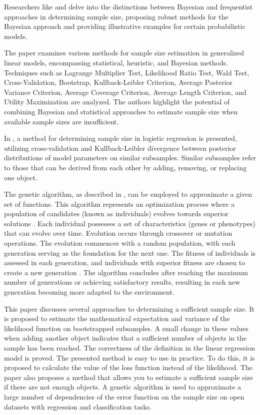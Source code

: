 \documentclass[
11pt,%
tightenlines,%
twoside,%
onecolumn,%
nofloats,%
nobibnotes,%
nofootinbib,%
superscriptaddress,%
noshowpacs,%
centertags]%
{revtex4-2}
\begin{document}
Researchers like \cite{Brutti2014} and \cite{Pezeshk2008} delve into the distinctions between Bayesian and frequentist approaches in determining sample size, proposing robust methods for the Bayesian approach and providing illustrative examples for certain probabilistic models.

The paper \cite{Grabovoy2022} examines various methods for sample size estimation in generalized linear models, encompassing statistical, heuristic, and Bayesian methods. Techniques such as Lagrange Multiplier Test, Likelihood Ratio Test, Wald Test, Cross-Validation, Bootstrap, Kullback-Leibler Criterion, Average Posterior Variance Criterion, Average Coverage Criterion, Average Length Criterion, and Utility Maximization are analyzed. The authors highlight the potential of combining Bayesian and statistical approaches to estimate sample size when available sample sizes are insufficient.

In \cite{MOTRENKO2014743}, a method for determining sample size in logistic regression is presented, utilizing cross-validation and Kullback-Leibler divergence between posterior distributions of model parameters on similar subsamples. Similar subsamples refer to those that can be derived from each other by adding, removing, or replacing one object.

The genetic algorithm, as described in \citep{Goldberg1988}, can be employed to approximate a given set of functions. This algorithm represents an optimization process where a population of candidates (known as individuals) evolves towards superior solutions \citep{Mirjalili2019}. Each individual possesses a set of characteristics (genes or phenotypes) that can evolve over time. Evolution occurs through crossover or mutation operations. The evolution commences with a random population, with each generation serving as the foundation for the next one. The fitness of individuals is assessed in each generation, and individuals with superior fitness are chosen to create a new generation \citep{Kramer2017}. The algorithm concludes after reaching the maximum number of generations or achieving satisfactory results, resulting in each new generation becoming more adapted to the environment.

This paper discusses several approaches to determining a sufficient sample size. It is proposed to estimate the mathematical expectation and variance of the likelihood function on bootstrapped subsamples. A small change in these values when adding another object indicates that a sufficient number of objects in the sample has been reached. The correctness of the definition in the linear regression model is proved. The presented method is easy to use in practice. To do this, it is proposed to calculate the value of the loss function instead of the likelihood. The paper also proposes a method that allows you to estimate a sufficient sample size if there are not enough objects. A genetic algorithm is used to approximate a large number of dependencies of the error function on the sample size on open datasets with regression and classification tasks.
\end{document}
